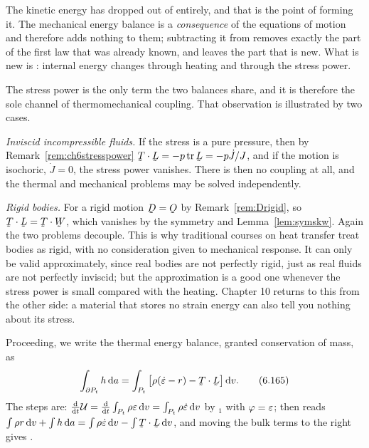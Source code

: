 
\begin{remark}\label{rem:ch6cancelK}
The kinetic energy has dropped out of  entirely, and that is
the point of forming it. The mechanical energy balance is a
\emph{consequence} of the equations of motion and therefore adds
nothing to them; subtracting it from  removes exactly the
part of the first law that was already known, and leaves the part that
is new. What is new is : internal energy changes through
heating and through the stress power.

The stress power is the only term the two balances share, and it is
therefore the sole channel of thermomechanical coupling. That
observation is illustrated by two cases.

\emph{Inviscid incompressible fluids.} If the stress is a pure
pressure, then by Remark~\ref{rem:ch6stresspower}
$\bT\cdot\bL=-p\tr\bL=-p\dot J/J$, and if the motion is isochoric,
$\dot J=0$, the stress power vanishes. There is then no coupling at
all, and the thermal and mechanical problems may be solved
independently.

\emph{Rigid bodies.} For a rigid motion $\bD=\Ob$ by
Remark~\ref{rem:Drigid}, so $\bT\cdot\bL=\bT\cdot\bW$, which vanishes
by the symmetry  and Lemma~\ref{lem:symskw}. Again the two
problems decouple. This is why traditional courses on heat transfer
treat bodies as rigid, with no consideration given to mechanical
response. It can only be valid approximately, since real bodies are not
perfectly rigid, just as real fluids are not perfectly inviscid; but
the approximation is a good one whenever the stress power is small
compared with the heating. Chapter 10
returns to this from the other side: a material that stores no strain
energy can also tell you nothing about its stress.
\end{remark}

Proceeding, we write the thermal energy balance, granted conservation
of mass, as
\begin{equation}
   \int_{\partial P_{t}}h\,\dl a
   =\int_{P_{t}}\big[\rho(\dot\eps-r)-\bT\cdot\bL\big]\,\dl v .
   \tag{6.165}\label{eq:6.165}
\end{equation}
The steps are: $\frac{\mathrm{d}}{\mathrm{d} t}\mathcal{U}
=\frac{\mathrm{d}}{\mathrm{d} t}\int_{P_{t}}\rho\varepsilon\,\mathrm{d} v
=\int_{P_{t}}\rho\dot{\varepsilon}\,\mathrm{d} v$ by $_{1}$ with
$\varphi=\varepsilon$; then  reads
$\int\rho r\,\dl v+\int h\,\dl a=\int\rho\dot\eps\,\dl v
-\int\bT\cdot\bL\,\dl v$, and moving the bulk terms to the right gives
.


